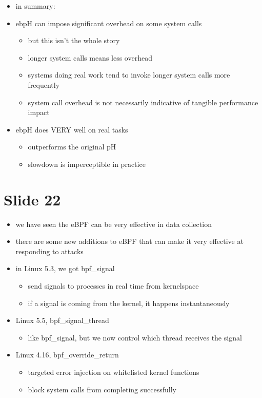 \documentclass[
  12pt]{findlay}
\providecommand{\tightlist}{\setlength{\itemsep}{0pt}\setlength{\parskip}{0pt}}
\begin{document}
\begin{itemize}
\tightlist
\item
  in summary:
\item
  ebpH can impose significant overhead on some system calls

  \begin{itemize}
  \tightlist
  \item
    but this isn't the whole story
  \item
    longer system calls means less overhead
  \item
    systems doing real work tend to invoke longer system calls more
    frequently
  \item
    system call overhead is not necessarily indicative of tangible
    performance impact
  \end{itemize}
\item
  ebpH does VERY well on real tasks

  \begin{itemize}
  \tightlist
  \item
    outperforms the original pH
  \item
    slowdown is imperceptible in practice
  \end{itemize}
\end{itemize}

\hypertarget{slide-22}{%
\section{Slide 22}\label{slide-22}}

\begin{itemize}
\tightlist
\item
  we have seen the eBPF can be very effective in data collection
\item
  there are some new additions to eBPF that can make it very effective
  at responding to attacks
\item
  in Linux 5.3, we got bpf\_signal

  \begin{itemize}
  \tightlist
  \item
    send signals to processes in real time from kernelspace
  \item
    if a signal is coming from the kernel, it happens instantaneously
  \end{itemize}
\item
  Linux 5.5, bpf\_signal\_thread

  \begin{itemize}
  \tightlist
  \item
    like bpf\_signal, but we now control which thread receives the
    signal
  \end{itemize}
\item
  Linux 4.16, bpf\_override\_return

  \begin{itemize}
  \tightlist
  \item
    targeted error injection on whitelisted kernel functions
  \item
    block system calls from completing successfully
  \end{itemize}
\end{itemize}
\end{document}
